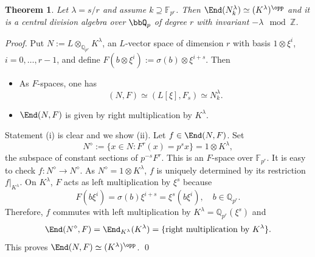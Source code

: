 \documentclass[]{amsart}
\theoremstyle{plain}
\newtheorem{thm}{Theorem}
\theoremstyle{definition}
\theoremstyle{remark}
\def\Qp{{\bbQ}_p}
\newcommand{\Z}{\mathbb Z}
\newcommand{\Q}{\mathbb Q}
\newcommand{\F}{\mathbb F}
\newcommand{\<}{\langle}   %
\renewcommand{\>}{\rangle} %
\begin{document}
\begin{thm}\label{thm:endo}
    Let $\lambda=s/r$ and assume $k\supseteq \F_{p^r}$. Then $\End(N_k^\lambda)\simeq (K^\lambda)^{\opp}$ and it is a central division algebra over $\Qp$ of degree $r$ with invariant $-\lambda \mod \Z$.  
\end{thm}
\begin{proof} 
    Put $N:=L\otimes_{\Q_{p^r}} K^\lambda$, an $L$-vector space of dimension $r$ with basis $1\otimes \xi^i$, $i=0,\dots, r-1$, and define $F(b\otimes \xi^i):=\sigma(b)\otimes \xi^{i+s}.$ Then 
    \begin{itemize}
        \item[(i)] As $F$-spaces, one has 
        \[ (N,F)\simeq (L[\xi],F_s)\simeq N^\lambda_k.  \]
        \item[(ii)] $\End(N,F)$ is given by right multiplication by $K^\lambda$.
    \end{itemize}
    Statement (i) is clear and we show (ii). Let $f\in \End(N,F)$. Set 
    \[ N^\diamond:=\{x\in N: F^r(x)=p^s x\}=1\otimes K^\lambda,\]
    the subspace of constant sections of $p^{-s} F^r$. This is an $F$-space over $\F_{p^r}$. It is easy to check $f:N^\diamond\to N^\diamond$. As $N^\diamond=1\otimes K^\lambda$, $f$ is uniquely determined by its restriction $f|_{K^\lambda}$. On $K^\lambda$, $F$ acts as left multiplication by $\xi^s$ because
    \[ F(b \xi^i)=\sigma(b)\xi^{i+s}=\xi^s(b \xi^i), \quad b\in \Q_{p^r}. \]
    Therefore, $f$ commutes with left multiplication by $K^\lambda=\Q_{p^r}(\xi^s)$ and
    \[ \End(N^\diamond,F)=\End_{K^\lambda}(K^\lambda)=\{\text{right multiplication by } K^\lambda\}. \]
    This proves $\End(N,F)\simeq (K^\lambda)^\opp$. \qed
\end{proof}
\end{document}
